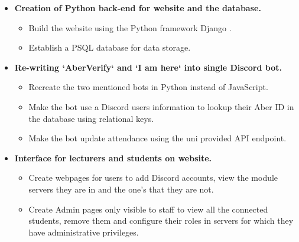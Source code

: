 \begin{itemize}
	\item \textbf{Creation of Python back-end for website and the database.}
	\begin{itemize}
		\item Build the website using the Python framework Django \cite{Django}.
		\item Establish a PSQL \cite{psql} database for data storage.
	\end{itemize}
	
	\item \textbf{Re-writing `AberVerify` and `I am here` into single Discord bot.}
	\begin{itemize}
		\item Recreate the two mentioned bots in Python instead of JavaScript.
		\item Make the bot use a Discord users information to lookup their Aber ID in the database using relational keys.
		\item Make the bot update attendance using the uni provided API endpoint.
	\end{itemize}
	
	\item \textbf{Interface for lecturers and students on website.}
	\begin{itemize}
		\item Create webpages for users to add Discord accounts, view the module servers they are in and the one's that they are not. 
		\item Create Admin pages only visible to staff to view all the connected students, remove them and configure their roles in servers for which they have administrative privileges.
	\end{itemize}
	

\end{itemize}
